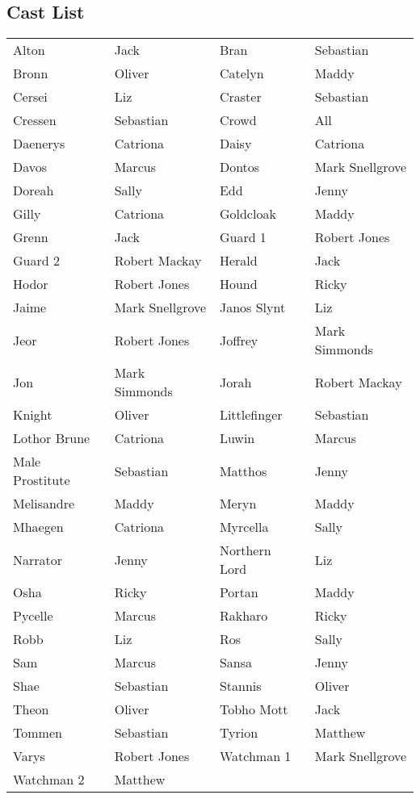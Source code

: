 \subsection*{Cast List}
\begin{tabular}{ll|ll}\\
Alton & Jack &  Bran & Sebastian\\
Bronn & Oliver &  Catelyn & Maddy\\
Cersei & Liz &  Craster & Sebastian\\
Cressen & Sebastian &  Crowd & All\\
Daenerys & Catriona &  Daisy & Catriona\\
Davos & Marcus &  Dontos & Mark Snellgrove\\
Doreah & Sally &  Edd & Jenny\\
Gilly & Catriona &  Goldcloak & Maddy\\
Grenn & Jack &  Guard 1 & Robert Jones\\
Guard 2 & Robert Mackay &  Herald & Jack\\
Hodor & Robert Jones &  Hound & Ricky\\
Jaime & Mark Snellgrove &  Janos Slynt & Liz\\
Jeor & Robert Jones &  Joffrey & Mark Simmonds\\
Jon & Mark Simmonds &  Jorah & Robert Mackay\\
Knight & Oliver &  Littlefinger & Sebastian\\
Lothor Brune & Catriona &  Luwin & Marcus\\
Male Prostitute & Sebastian &  Matthos & Jenny\\
Melisandre & Maddy &  Meryn & Maddy\\
Mhaegen & Catriona &  Myrcella & Sally\\
Narrator & Jenny &  Northern Lord & Liz\\
Osha & Ricky &  Portan & Maddy\\
Pycelle & Marcus &  Rakharo & Ricky\\
Robb & Liz &  Ros & Sally\\
Sam & Marcus &  Sansa & Jenny\\
Shae & Sebastian &  Stannis & Oliver\\
Theon & Oliver &  Tobho Mott & Jack\\
Tommen & Sebastian &  Tyrion & Matthew\\
Varys & Robert Jones &  Watchman 1 & Mark Snellgrove\\
Watchman 2 & Matthew &  \end{tabular}
